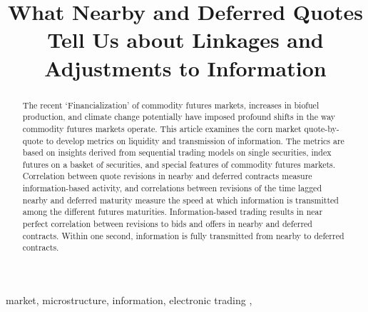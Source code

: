 \documentclass[review,12pt]{elsarticle}
\begin{document}
\begin{frontmatter}

  \title{What Nearby and Deferred Quotes Tell Us about Linkages and Adjustments
to Information}

  
  \begin{abstract}
  The recent `Financialization' of commodity futures markets, increases in
  biofuel production, and climate change potentially have imposed profound
  shifts in the way commodity futures markets operate. This article
  examines the corn market quote-by-quote to develop metrics on liquidity
  and transmission of information. The metrics are based on insights
  derived from sequential trading models on single securities, index
  futures on a basket of securities, and special features of commodity
  futures markets. Correlation between quote revisions in nearby and
  deferred contracts measure information-based activity, and correlations
  between revisions of the time lagged nearby and deferred maturity
  measure the speed at which information is transmitted among the
  different futures maturities. Information-based trading results in near
  perfect correlation between revisions to bids and offers in nearby and
  deferred contracts. Within one second, information is fully transmitted
  from nearby to deferred contracts.
  \end{abstract}
   \begin{keyword} market, microstructure, information, electronic trading \sep \end{keyword}
 \end{frontmatter}
\end{document}
